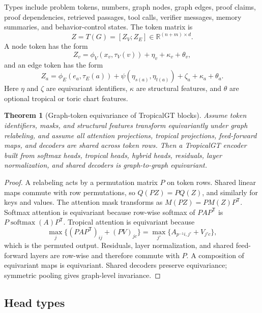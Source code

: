 \documentclass[11pt]{article}
\newtheorem{theorem}[definition]{Theorem}
\newcommand{\R}{\mathbb{R}}
\newcommand{\softmax}{\operatorname{softmax}}
\newcommand{\trans}{^{\mathsf T}}
\begin{document}
Types include problem tokens, numbers, graph nodes, graph edges, proof claims, proof dependencies, retrieved passages, tool calls, verifier messages, memory summaries, and behavior-control states.  The token matrix is
\begin{equation}
Z=T(G)=[Z_V;Z_E]\in\R^{(n+m)\times d}.
\end{equation}
A node token has the form
\begin{equation}
Z_v=\phi_V(x_v,\tau_V(v))+\eta_v+\kappa_v+\theta_v,
\end{equation}
and an edge token has the form
\begin{equation}
Z_a=\phi_E(e_a,\tau_E(a))+\psi(\eta_{s(a)},\eta_{t(a)})+\zeta_a+\kappa_a+\theta_a.
\end{equation}
Here \(\eta\) and \(\zeta\) are equivariant identifiers, \(\kappa\) are structural features, and \(\theta\) are optional tropical or toric chart features.

\begin{theorem}[Graph-token equivariance of TropicalGT blocks]
Assume token identifiers, masks, and structural features transform equivariantly under graph relabeling, and assume all attention projections, tropical projections, feed-forward maps, and decoders are shared across token rows.  Then a TropicalGT encoder built from softmax heads, tropical heads, hybrid heads, residuals, layer normalization, and shared decoders is graph-to-graph equivariant.
\end{theorem}
\begin{proof}
A relabeling acts by a permutation matrix \(P\) on token rows.  Shared linear maps commute with row permutations, so \(Q(PZ)=PQ(Z)\), and similarly for keys and values.  The attention mask transforms as \(M(PZ)=PM(Z)P\trans\).  Softmax attention is equivariant because row-wise softmax of \(PAP\trans\) is \(P\softmax(A)P\trans\).  Tropical attention is equivariant because
\begin{equation}
\max_j\{(PAP\trans)_{ij}+(PV)_{jc}\}=\max_{j'}\{A_{p^{-1}i,j'}+V_{j'c}\},
\end{equation}
which is the permuted output.  Residuals, layer normalization, and shared feed-forward layers are row-wise and therefore commute with \(P\).  A composition of equivariant maps is equivariant.  Shared decoders preserve equivariance; symmetric pooling gives graph-level invariance.
\end{proof}

\subsection{Head types}
\end{document}
